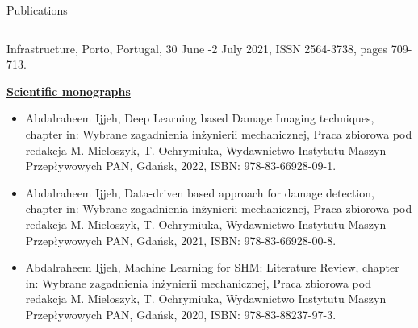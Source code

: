 \documentclass[10pt,aspectratio=169,dvipsnames]{beamer} %
\begin{document}
\begin{frame}{Publications}
\begin{tiny}
\begin{columns}[T]
\begin{column}[t]{0.48\textwidth}
\begin{itemize}
						Infrastructure, Porto, Portugal, 30 June -2 July 2021, ISSN 2564-3738, pages 709-713.
					\end{itemize}		
					\underline{\textbf{Scientific monographs}}					
					\begin{itemize}
						\item {Abdalraheem Ijjeh}, Deep Learning based Damage Imaging techniques, chapter in: Wybrane zagadnienia
						inżynierii mechanicznej, Praca zbiorowa pod redakcja M. Mieloszyk, T. Ochrymiuka, Wydawnictwo Instytutu
						Maszyn Przepływowych PAN, Gdańsk, 2022, ISBN: 978-83-66928-09-1.
						\item {Abdalraheem Ijjeh}, Data-driven based approach for damage detection, chapter in: Wybrane zagadnienia
						inżynierii mechanicznej, Praca zbiorowa pod redakcja M. Mieloszyk, T. Ochrymiuka, Wydawnictwo Instytutu
						Maszyn Przepływowych PAN, Gdańsk, 2021, ISBN: 978-83-66928-00-8.				
						\item {Abdalraheem Ijjeh}, Machine Learning for SHM: Literature Review, chapter in: Wybrane zagadnienia
						inżynierii mechanicznej, Praca zbiorowa pod redakcja M. Mieloszyk, T. Ochrymiuka, Wydawnictwo Instytutu
						Maszyn Przepływowych PAN, Gdańsk, 2020, ISBN: 978-83-88237-97-3.
					\end{itemize}
				\end{column}		
			\end{columns}
		\end{tiny}
	\end{frame}	
	
\end{document}
